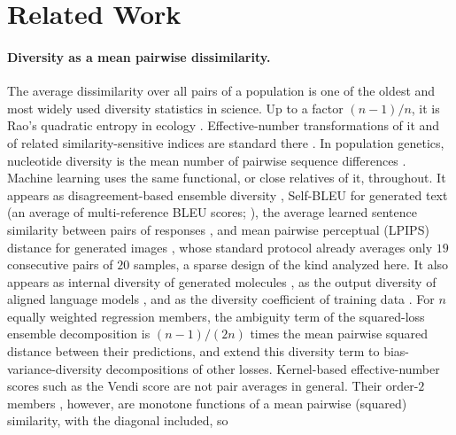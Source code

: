 \section{Related Work}
\label{sec:related}

\paragraph{Diversity as a mean pairwise dissimilarity.}
The average dissimilarity over all pairs of a population is one of the oldest
and most widely used diversity statistics in science. Up to a factor $(n-1)/n$, it is Rao's quadratic
entropy in ecology \citep{rao1982diversity}. Effective-number transformations
of it and of related similarity-sensitive indices are standard there
\citep{hill1973diversity,leinster2012measuring,chiu2014distance}. In population
genetics, nucleotide diversity is the mean number of pairwise sequence
differences \citep{nei1979mathematical,tajima1983evolutionary}. Machine learning
uses the same functional, or close relatives of it, throughout. It appears as
disagreement-based ensemble diversity \citep{kuncheva2003measures}, Self-BLEU for
generated text (an average of multi-reference BLEU scores; \citealp{zhu2018texygen}),
the average learned sentence similarity between pairs of responses
\citep{tevet2021evaluating},
and mean pairwise perceptual (LPIPS) distance for generated images
\citep{zhu2017toward,zhang2018unreasonable}, whose standard protocol already
averages only $19$ consecutive pairs of $20$ samples, a sparse design of the
kind analyzed here. It also appears as internal diversity of
generated molecules \citep{polykovskiy2020molecular}, as the output diversity of
aligned language models \citep{kirk2024understanding}, and as the diversity
coefficient of training data \citep{miranda2023beyond}. For $n$ equally weighted
regression members, the ambiguity term of the squared-loss ensemble
decomposition \citep{krogh1995neural} is $(n-1)/(2n)$ times the mean pairwise
squared distance between their predictions, and \citet{wood2023unified} extend
this diversity term to bias-variance-diversity decompositions of other losses. Kernel-based
effective-number scores such as the Vendi score \citep{friedman2023vendi} are
not pair averages in general. Their order-$2$ members \citep{pasarkar2024cousins},
however, are monotone
functions of a mean pairwise (squared) similarity, with the diagonal included, so

